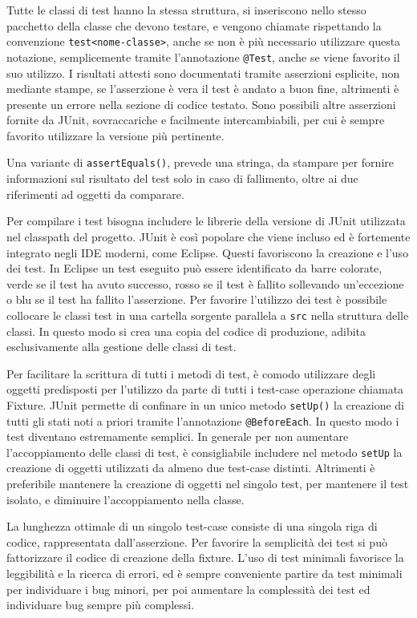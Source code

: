 \documentclass{article}
\numberwithin{equation}{subsection}
\begin{document}
Tutte le classi di test hanno la stessa struttura, si inseriscono nello stesso pacchetto della classe che devono testare, e vengono chiamate rispettando la convenzione 
\verb|test<nome-classe>|, anche se non è più necessario utilizzare questa notazione, semplicemente tramite l'annotazione \verb|@Test|, anche se viene favorito il suo 
utilizzo. I risultati attesti sono documentati tramite asserzioni esplicite, non mediante stampe, se l'asserzione è vera il test è andato a buon fine, altrimenti è 
presente un errore nella sezione di codice testato. Sono possibili altre asserzioni fornite da JUnit, sovraccariche e facilmente intercambiabili, per cui è sempre 
favorito utilizzare la versione più pertinente. 

Una variante di \verb|assertEquals()|, prevede una stringa, da stampare per fornire informazioni sul risultato del test solo in caso di fallimento, oltre ai due riferimenti ad oggetti da 
comparare. 

Per compilare i test bisogna includere le librerie della versione di JUnit utilizzata nel classpath del progetto. JUnit è così popolare che viene incluso ed è fortemente integrato 
negli IDE moderni, come Eclipse. Questi favoriscono la creazione e l'uso dei test. In Eclipse un test eseguito può essere identificato da barre colorate, verde se il test ha avuto successo, 
rosso se il test è fallito sollevando un'eccezione o blu se il test ha fallito l'asserzione. 
Per favorire l'utilizzo dei test è possibile collocare le classi test in una cartella sorgente parallela a \verb|src| nella struttura delle classi. In questo modo si crea una copia del codice 
di produzione, adibita esclusivamente alla gestione delle classi di test. 

Per facilitare la scrittura di tutti i metodi di test, è comodo utilizzare degli oggetti predisposti per l'utilizzo da parte di tutti i test-case operazione chiamata 
Fixture. JUnit permette di confinare in un unico metodo \verb|setUp()| la creazione di tutti gli stati noti a priori tramite l'annotazione \verb|@BeforeEach|. 
In questo modo i test diventano estremamente semplici. 
In generale per non aumentare l'accoppiamento delle classi di test, è consigliabile includere nel metodo \verb|setUp| la creazione di oggetti utilizzati da almeno due test-case distinti. 
Altrimenti è preferibile mantenere la creazione di oggetti nel singolo test, per mantenere il test isolato, e diminuire l'accoppiamento nella classe. 

La lunghezza ottimale di un singolo test-case consiste di una singola riga di codice, rappresentata dall'asserzione. Per favorire la semplicità dei test si può 
fattorizzare il codice di creazione della fixture. 
L'uso di test minimali favorisce la leggibilità e la ricerca di errori, ed è sempre conveniente partire da test minimali per individuare i bug minori, per poi 
aumentare la complessità dei test ed individuare bug sempre più complessi. 
\end{document}
